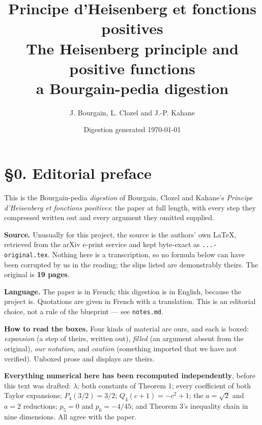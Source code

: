 \documentclass[11pt,reqno]{amsart}
\theoremstyle{plain}
\theoremstyle{definition}
\theoremstyle{remark}
\begin{document}
\title[Heisenberg principle and positive functions --- digestion]
      {Principe d'Heisenberg et fonctions positives\\
       \normalsize The Heisenberg principle and positive functions\\
       \normalsize a Bourgain-pedia digestion}
\author{J. Bourgain, L. Clozel and J.-P. Kahane}
\address{Original: Ann.\ Inst.\ Fourier \textbf{60} (2010), 1215--1232; arXiv:0811.4360}
\date{Digestion generated \today}
\maketitle

\section*{\S0. Editorial preface}

This is the Bourgain-pedia \emph{digestion} of Bourgain, Clozel and Kahane's
\emph{Principe d'Heisenberg et fonctions positives}: the paper at full length, with
every step they compressed written out and every argument they omitted supplied.

\medskip
\noindent\textbf{Source.} Unusually for this project, the source is the authors' own
LaTeX, retrieved from the arXiv e-print service and kept byte-exact as
\texttt{...-original.tex}. Nothing here is a transcription, so no formula below can
have been corrupted by us in the reading; the slips listed are demonstrably theirs.
The original is \textbf{19 pages}.

\medskip
\noindent\textbf{Language.} The paper is in French; this digestion is in English,
because the project is. Quotations are given in French with a translation. This is an
editorial choice, not a rule of the blueprint --- see \texttt{notes.md}.

\medskip
\noindent\textbf{How to read the boxes.} Four kinds of material are ours, and each is
boxed: \emph{expansion} (a step of theirs, written out), \emph{filled} (an argument
absent from the original), \emph{our notation}, and \emph{caution} (something imported
that we have not verified). Unboxed prose and displays are theirs.

\medskip
\noindent\textbf{Everything numerical here has been recomputed independently}, before
this text was drafted: $\lambda$; both constants of Theorem 1; every coefficient of
both Taylor expansions; $P_4(3/2)=3/2$; $Q_4(c+1)=-c^2+1$; the $a=\sqrt2$ and $a=2$
reductions; $p_5=0$ and $p_6=-4/45$; and Theorem 3's inequality chain in nine
dimensions. All agree with the paper.
\end{document}
